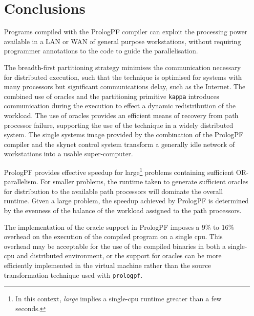 \chapter{Conclusions}
\label{conclusions}

Programs compiled with the PrologPF compiler can exploit the processing
power available in a LAN or WAN of general purpose workstations, without
requiring programmer annotations to the code to guide the parallelisation.

The breadth-first partitioning strategy minimises the communication
necessary for distributed execution, such that the technique is
optimised for systems with many processors but significant communications
delay, such as the Internet.
The combined use of oracles and the partitioning primitive \texttt{kappa}
introduces communication during the execution to effect a dynamic redistribution
of the workload.
The use of oracles provides an efficient
means of recovery from path processor failure, supporting the use of
the technique in a widely distributed system.  The single systems
image provided by the combination of the PrologPF compiler and the
skynet control system transform a generally idle network of
workstations into a usable super-computer.

PrologPF provides effective speedup for large\footnote{In this context, \textit{large}
implies a single-cpu runtime greater than a few seconds.}
problems containing sufficient OR-parallelism.  For smaller problems, the runtime
taken to generate sufficient oracles for distribution to the available path processors
will dominate the overall runtime.
Given a large problem, the speedup achieved by PrologPF is determined by the
evenness of the balance of the workload assigned to the path processors.

The implementation of the oracle support in PrologPF imposes a 9\% to 16\%
overhead on the execution of the compiled program on a single cpu.  This overhead
may be acceptable for the use of the compiled binaries in both a single-cpu and
distributed environment, or the support for oracles can be more efficiently implemented
in the virtual machine rather than the source transformation technique used with
\texttt{prologpf}.

